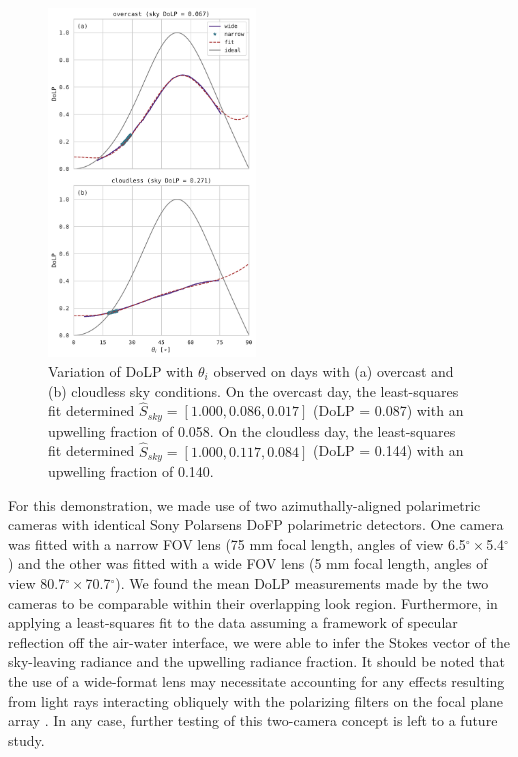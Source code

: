 \documentclass[letterpaper,journal]{IEEEtran}
\begin{document}
\begin{figure}[!ht]
    \centering
    \includegraphics[width=0.49\textwidth]{_figures/DoLP_AOI_field.pdf}
    \vspace{-10pt}
    \caption{Variation of DoLP with $\theta_i$ observed on days with (a) overcast and (b) cloudless sky conditions. On the overcast day, the least-squares fit determined $\hat{S}_{sky}=[1.000,0.086,0.017]$ (DoLP = 0.087) with an upwelling fraction of 0.058. On the cloudless day, the least-squares fit determined $\hat{S}_{sky}=[1.000,0.117,0.084]$ (DoLP = 0.144) with an upwelling fraction of 0.140.}
    \label{fig:DoLP_AOI_field}
\end{figure}

For this demonstration, we made use of two azimuthally-aligned polarimetric cameras with identical Sony Polarsens DoFP polarimetric detectors. One camera was fitted with a narrow FOV lens (75 mm focal length, angles of view 6.5$^{\circ}\times$5.4$^{\circ}$) and the other was fitted with a wide FOV lens (5 mm focal length, angles of view 80.7$^{\circ}\times$70.7$^{\circ}$). We found the mean DoLP measurements made by the two cameras to be comparable within their overlapping look region. Furthermore, in applying a least-squares fit to the data assuming a framework of specular reflection off the air-water interface, we were able to infer the Stokes vector of the sky-leaving radiance and the upwelling radiance fraction. It should be noted that the use of a wide-format lens may necessitate accounting for any effects resulting from light rays interacting obliquely with the polarizing filters on the focal plane array \cite{pistellato_geometric_2024}. In any case, further testing of this two-camera concept is left to a future study.
\end{document}
